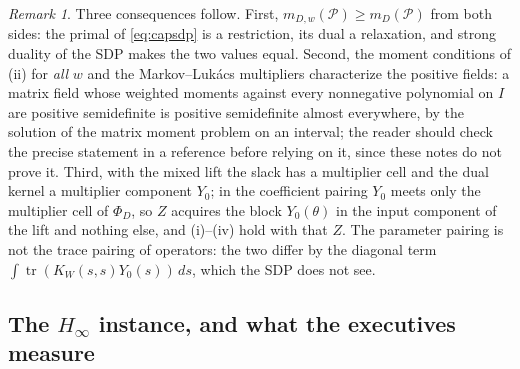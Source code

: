 \documentclass[12pt]{article}
\newcommand{\mcl}[1]{\mathcal{#1}}
\DeclareMathOperator{\tr}{tr}
\theoremstyle{plain}
\theoremstyle{definition}
\theoremstyle{remark}
\newtheorem*{remark}{Remark}
\begin{document}
\begin{remark}
Three consequences follow. First, $m_{D,w}(\mcl P)\ge m_D(\mcl P)$ from both sides: the primal of \eqref{eq:capsdp} is a restriction, its dual a relaxation, and strong duality of the SDP makes the two values equal. Second, the moment conditions of (ii) for \emph{all} $w$ and the Markov--Luk\'acs multipliers characterize the positive fields: a matrix field whose weighted moments against every nonnegative polynomial on $I$ are positive semidefinite is positive semidefinite almost everywhere, by the solution of the matrix moment problem on an interval; the reader should check the precise statement in a reference before relying on it, since these notes do not prove it. Third, with the mixed lift the slack has a multiplier cell and the dual kernel a multiplier component $Y_0$; in the coefficient pairing $Y_0$ meets only the multiplier cell of $\Phi_D$, so $Z$ acquires the block $Y_0(\theta)$ in the input component of the lift and nothing else, and (i)--(iv) hold with that $Z$. The parameter pairing is not the trace pairing of operators: the two differ by the diagonal term $\int\tr(K_W(s,s)Y_0(s))\,ds$, which the SDP does not see.
\end{remark}

\subsection{The $H_\infty$ instance, and what the executives measure}\label{sec:kyp}
\end{document}
